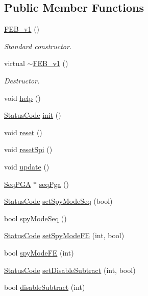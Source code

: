 \subsection*{Public Member Functions}
\begin{DoxyCompactItemize}
\item 
\hyperlink{classFEB__v1_aad65ff3d95f3f60583dad914f9c18a9d}{F\+E\+B\+\_\+v1} ()
\begin{DoxyCompactList}\small\item\em Standard constructor. \end{DoxyCompactList}\item 
virtual \hyperlink{classFEB__v1_a655c6fb31068c4dbb7fde34de77a5a49}{$\sim$\+F\+E\+B\+\_\+v1} ()
\begin{DoxyCompactList}\small\item\em Destructor. \end{DoxyCompactList}\item 
void \hyperlink{classFEB__v1_af93db546ad89ba7c2301fdc2314efd8a}{help} ()
\item 
\hyperlink{classStatusCode}{Status\+Code} \hyperlink{classFEB__v1_a70d7d266c7d05fdfab21d5b0293f1ad8}{init} ()
\item 
void \hyperlink{classFEB__v1_a4e147b894ecbf4b05b92d01270d7ff13}{reset} ()
\item 
void \hyperlink{classFEB__v1_a1a50b5fff8a6e170fe136657f75b8ad4}{reset\+Spi} ()
\item 
void \hyperlink{classFEB__v1_a96ad348b7be37686998c0eaa7fd2e83e}{update} ()
\item 
\hyperlink{classSeqPGA}{Seq\+P\+GA} $\ast$ \hyperlink{classFEB__v1_a8bf655504f9b0c51d5aa5bc6b30da00d}{seq\+Pga} ()
\item 
\hyperlink{classStatusCode}{Status\+Code} \hyperlink{classFEB__v1_a9e13da349fc335ec44032fa0426c40d0}{set\+Spy\+Mode\+Seq} (bool)
\item 
bool \hyperlink{classFEB__v1_a3ec8b74aedfbe5e3d3ce0d4b4eb44330}{spy\+Mode\+Seq} ()
\item 
\hyperlink{classStatusCode}{Status\+Code} \hyperlink{classFEB__v1_ab88d23abb96f746298e0fa1e1cf63e3e}{set\+Spy\+Mode\+FE} (int, bool)
\item 
bool \hyperlink{classFEB__v1_a0b6d25515e575e370552c6b6f715fd76}{spy\+Mode\+FE} (int)
\item 
\hyperlink{classStatusCode}{Status\+Code} \hyperlink{classFEB__v1_a067a0aeae34dbd782547afbcd82fc77f}{set\+Disable\+Subtract} (int, bool)
\item 
bool \hyperlink{classFEB__v1_a3d224acca0807603d14b72cff6359b3f}{disable\+Subtract} (int)

\end{DoxyCompactItemize}
